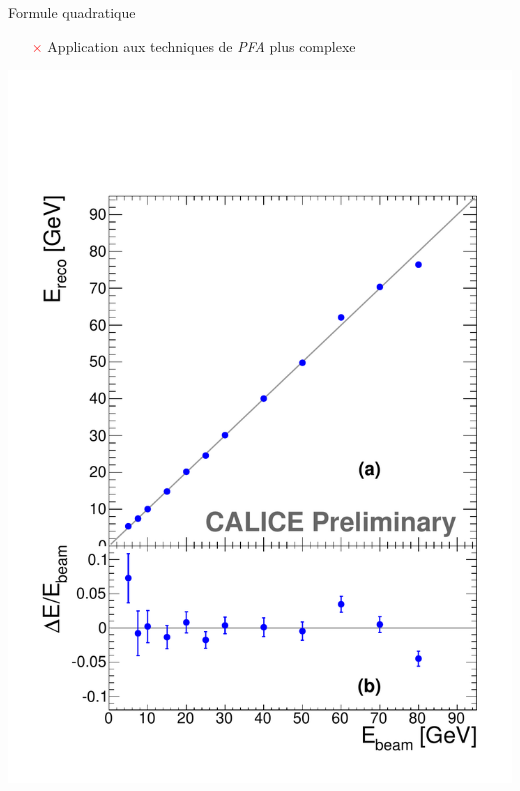 \documentclass[8pt]{beamer}
\begin{document}
\begin{frame}
\begin{minipage}{0.65\linewidth}
\begin{block}{Formule quadratique}
\begin{itemize}
          \item[\textcolor{red}{$\times$}] Application aux techniques de \textit{PFA} plus complexe
        \end{itemize}
      \end{block}
    \end{minipage} \hfill
    \begin{minipage}{0.3\linewidth}
      \pause
      \begin{center}
        \includegraphics[width=\linewidth]{figs/Energy-Linearity.pdf} \\

\end{center}
\end{minipage}
\end{frame}
\end{document}
